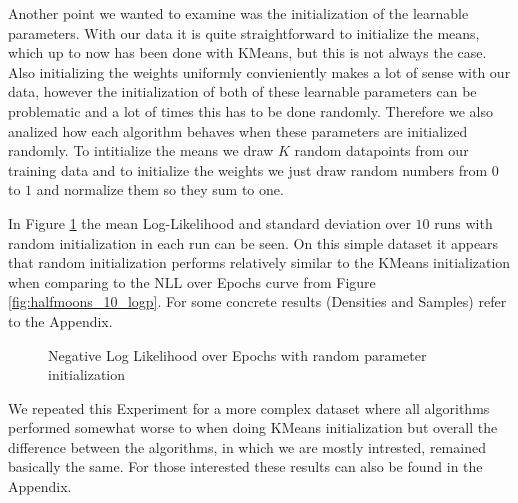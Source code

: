 Another point we wanted to examine was the initialization of the learnable parameters.
With our data it is quite straightforward to initialize the means, which up to now has been done with KMeans, but this is not always the case.
Also initializing the weights uniformly convieniently makes a lot of sense with our data, however the initialization of both of these 
learnable parameters can be problematic and a lot of times this has to be done randomly. Therefore we also analized how each algorithm 
behaves when these parameters are initialized randomly. To intitialize the means we draw $K$ random datapoints from our training data and 
to initialize the weights we just draw random numbers from $0$ to $1$ and normalize them so they sum to one.

In Figure \ref{fig:halfmoons_10_random_logp} the mean Log-Likelihood and standard deviation over $10$ runs with random initialization in each run can be seen. 
On this simple dataset it appears that random initialization performs relatively similar to the KMeans initialization when comparing 
to the NLL over Epochs curve from Figure \ref{fig:halfmoons_10_logp}. For some concrete results (Densities and Samples) refer to the Appendix.

\begin{figure}[H]
    \centering
    \caption{Negative Log Likelihood over Epochs with random parameter initialization}
    \label{fig:halfmoons_10_random_logp}
\end{figure}

We repeated this Experiment for a more complex dataset where all algorithms performed somewhat worse to 
when doing KMeans initialization but overall the difference between the algorithms, in which we are mostly intrested, 
remained basically the same. For those interested these results can also be found in the Appendix.

